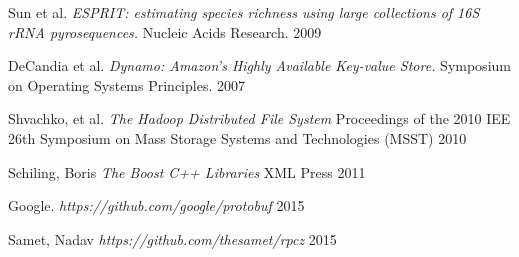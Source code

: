 \documentclass[11pt]{article}
\begin{document}
\begin{thebibliography}{99}
  Sun et al.
  \emph{ESPRIT: estimating species richness using large collections of 16S rRNA pyrosequences.}
  Nucleic Acids Research.
  2009


  DeCandia et al.
  \emph{Dynamo: Amazon’s Highly Available Key-value Store.}
  Symposium on Operating Systems Principles.
  2007

Shvachko, et al.
\emph{The Hadoop Distributed File System}
Proceedings of the 2010 IEE 26th Symposium on Mass Storage Systems and Technologies (MSST)
2010

Schiling, Boris
\emph{The Boost C++ Libraries}
XML Press
2011

Google.
\emph{https://github.com/google/protobuf}
2015

Samet, Nadav
\emph{https://github.com/thesamet/rpcz}
2015

\end{thebibliography}
\end{document}
